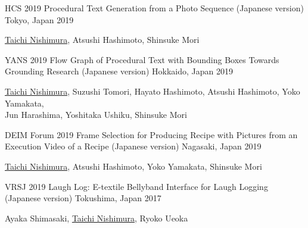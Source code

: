 \begin{cventries}
  \cventry
    {HCS 2019} %
    {Procedural Text Generation from a Photo Sequence (Japanese version)} %
    {Tokyo, Japan} %
    {2019} %
    {
      \begin{cvitems} %
        \item {\underline{Taichi Nishimura}, Atsushi Hashimoto, Shinsuke Mori}
      \end{cvitems}
    }
  \cventry
    {YANS 2019} %
    {Flow Graph of Procedural Text with Bounding Boxes Towards Grounding Research (Japanese version)} %
    {Hokkaido, Japan} %
    {2019} %
    {
      \begin{cvitems} %
        \item {\underline{Taichi Nishimura}, Suzushi Tomori, Hayato Hashimoto, Atsushi Hashimoto, Yoko Yamakata, \\ Jun Harashima, Yoshitaka Ushiku, Shinsuke Mori}
      \end{cvitems}
    }
  \cventry
    {DEIM Forum 2019} %
    {Frame Selection for Producing Recipe with Pictures from an Execution Video of a Recipe (Japanese version)} %
    {Nagasaki, Japan} %
    {2019} %
    {
      \begin{cvitems} %
        \item {\underline{Taichi Nishimura}, Atsushi Hashimoto, Yoko Yamakata, Shinsuke Mori}
      \end{cvitems}
    }
  \cventry
    {VRSJ 2019} %
    {Laugh Log: E-textile Bellyband Interface for Laugh Logging (Japanese version)} %
    {Tokushima, Japan} %
    {2017} %
    {
      \begin{cvitems} %
        \item {Ayaka Shimasaki, \underline{Taichi Nishimura}, Ryoko Ueoka}
      \end{cvitems}
    }
\end{cventries}